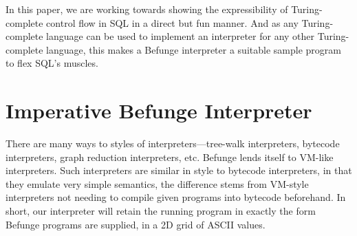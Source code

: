 \documentclass[sigconf,nonacm,screen,review,balance=false]{acmart}
\begin{document}
In this paper, we are working towards showing the expressibility of
Turing-complete control flow in SQL in a direct but fun manner. And as any
Turing-complete language can be used to implement an interpreter for any other
Turing-complete language, this makes a Befunge\footnotemark{} interpreter a
suitable sample program to flex SQL's muscles.


\section{Imperative Befunge Interpreter}
\label{sec:py-inter}

There are many ways to styles of interpreters---tree-walk interpreters, bytecode
interpreters, graph reduction interpreters, etc. Befunge lends itself to
VM-like interpreters. Such interpreters are similar in style to bytecode
interpreters, in that they emulate very simple semantics, the difference stems
from VM-style interpreters not needing to compile given programs into bytecode
beforehand. In short, our interpreter will retain the running program in
exactly the form Befunge programs are supplied, in a 2D grid of ASCII values.
\end{document}
